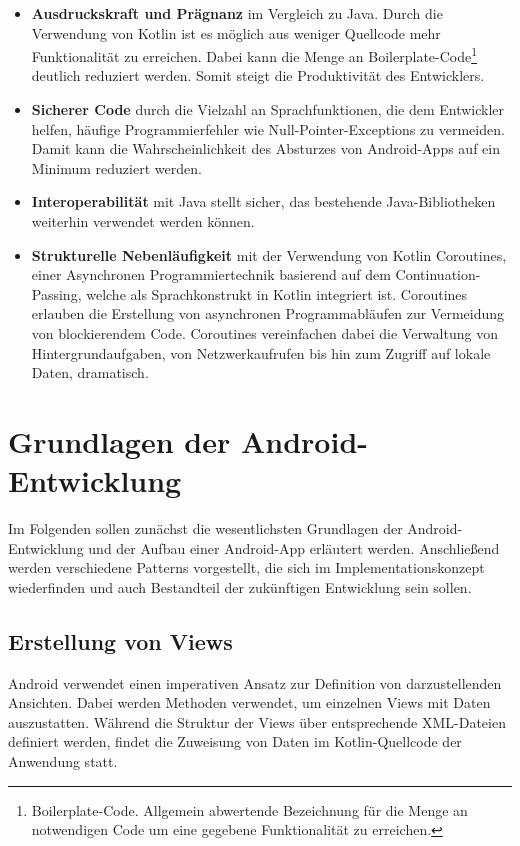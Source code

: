 \begin{itemize}
    \item \textbf{Ausdruckskraft und Prägnanz} im Vergleich zu Java. Durch die Verwendung von Kotlin ist es möglich aus weniger Quellcode mehr Funktionalität zu erreichen. Dabei kann die Menge an Boilerplate-Code\footnote{Boilerplate-Code. Allgemein abwertende Bezeichnung für die Menge an notwendigen Code um eine gegebene Funktionalität zu erreichen.} deutlich reduziert werden. Somit steigt die Produktivität des Entwicklers.
    \item \textbf{Sicherer Code} durch die Vielzahl an Sprachfunktionen, die dem Entwickler helfen, häufige Programmierfehler wie Null-Pointer-Exceptions zu vermeiden. Damit kann die Wahrscheinlichkeit des Absturzes von Android-Apps auf ein Minimum reduziert werden. \newpage
    \item \textbf{Interoperabilität} mit Java stellt sicher, das bestehende Java-Bibliotheken weiterhin verwendet werden können.
    \item \textbf{Strukturelle Nebenläufigkeit} mit der Verwendung von Kotlin Coroutines, einer Asynchronen Programmiertechnik basierend auf dem Continuation-Passing, welche als Sprachkonstrukt in Kotlin integriert ist. Coroutines erlauben die Erstellung von asynchronen Programmabläufen zur Vermeidung von blockierendem Code. Coroutines vereinfachen dabei die Verwaltung von Hintergrundaufgaben, von Netzwerkaufrufen bis hin zum Zugriff auf lokale Daten, dramatisch.    
  \end{itemize}

\section{Grundlagen der Android-Entwicklung}

Im Folgenden sollen zunächst die wesentlichsten Grundlagen der Android-Entwicklung und der Aufbau einer Android-App erläutert werden. Anschließend werden verschiedene Patterns vorgestellt, die sich im Implementationskonzept wiederfinden und auch Bestandteil der zukünftigen Entwicklung sein sollen.

\subsection{Erstellung von Views}

Android verwendet einen imperativen Ansatz zur Definition von darzustellenden Ansichten. Dabei werden Methoden verwendet, um einzelnen Views mit Daten auszustatten. Während die Struktur der Views über entsprechende XML-Dateien definiert werden, findet die Zuweisung von Daten im Kotlin-Quellcode der Anwendung statt.


